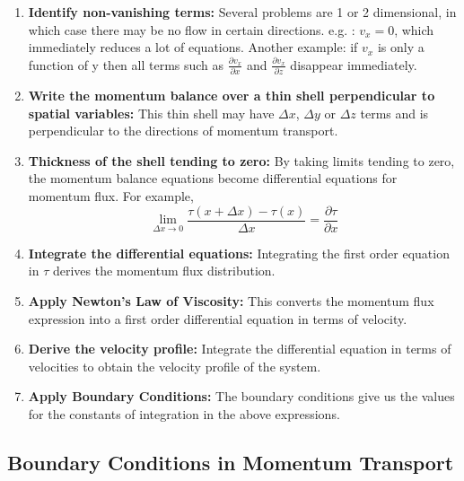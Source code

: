 \begin{enumerate}

    \item \textbf{Identify non-vanishing terms:} Several problems are 1 or 2 dimensional, in which case there may be no flow in certain directions. e.g. : $v_{x} = 0$, which immediately reduces a lot of equations. Another example: if $v_{x}$ is only a function of y then all terms such as $\frac{\partial v_{x}}{\partial x}$ and $\frac{\partial v_{x}}{\partial z}$ disappear immediately.

    \item \textbf{Write the momentum balance over a thin shell perpendicular to spatial variables:} This thin shell may have $\Delta x$, $\Delta y$ or $\Delta z$ terms and is perpendicular to the directions of momentum transport.

\item \textbf{Thickness of the shell tending to zero:} By taking limits tending to zero, the momentum balance equations become differential equations for momentum flux. For example, \[\lim_{\Delta x \to 0} \frac{\tau(x+\Delta x) - \tau(x)}{\Delta x} = \frac{\partial \tau}{\partial x}\]

    \item \textbf{Integrate the differential equations:} Integrating the first order equation in $\tau$ derives the momentum flux distribution.

    \item \textbf{Apply Newton's Law of Viscosity:} This converts the momentum flux expression into a first order differential equation in terms of velocity.

    \item \textbf{Derive the velocity profile:} Integrate the differential equation in terms of velocities to obtain the velocity profile of the system.

    \item \textbf{Apply Boundary Conditions:} The boundary conditions give us the values for the constants of integration in the above expressions.

\end{enumerate}

\subsection{Boundary Conditions in Momentum Transport}

